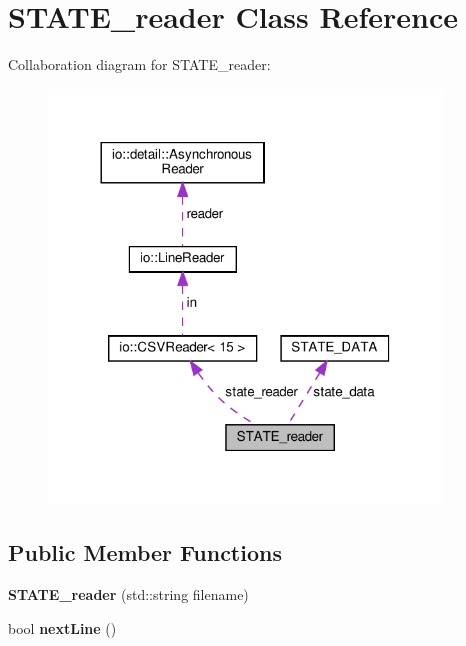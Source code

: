\hypertarget{classSTATE__reader}{}\section{S\+T\+A\+T\+E\+\_\+reader Class Reference}
\label{classSTATE__reader}


Collaboration diagram for S\+T\+A\+T\+E\+\_\+reader\+:\nopagebreak
\begin{figure}[H]
\begin{center}
\leavevmode
\includegraphics[width=296pt]{classSTATE__reader__coll__graph}
\end{center}
\end{figure}
\subsection*{Public Member Functions}
\begin{DoxyCompactItemize}
\item 
\mbox{\label{classSTATE__reader_a5ad5acce808ca1ed4279ac7da1d5db4c}} 
{\bfseries S\+T\+A\+T\+E\+\_\+reader} (std\+::string filename)
\item 
\mbox{\label{classSTATE__reader_a3af8f3f84ab16bb80089c19f14a40669}} 
bool {\bfseries next\+Line} ()
\end{DoxyCompactItemize}
